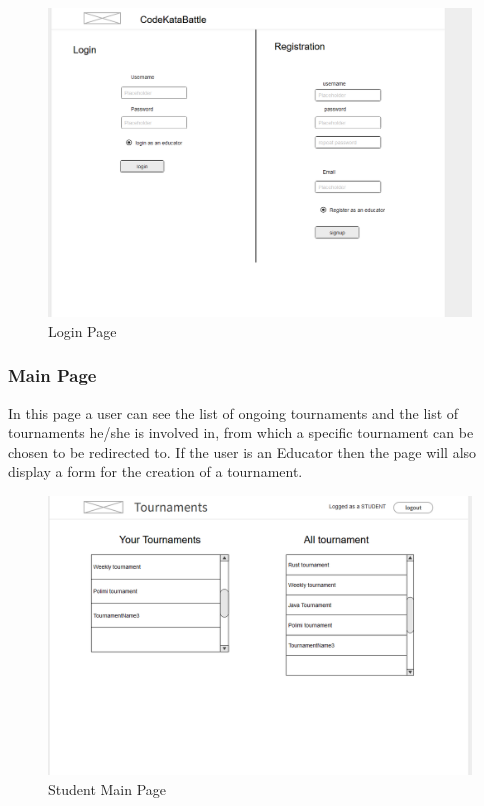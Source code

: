 \begin{figure}[H]
    \centering
    \includegraphics[width=1\linewidth]{misc//Images//UI Mockups/login.png}
    \caption{Login Page}
    \label{fig:enter-label}
\end{figure}
\newpage
\subsubsection{Main Page}
In this page a user can see the list of ongoing tournaments and the list of tournaments he/she is involved in, from which a specific tournament can be chosen to be redirected to.
If the user is an Educator then the page will also display a form for the creation of a tournament.

\begin{figure}[H]
    \centering
    \includegraphics[width=0.8\linewidth]{misc//Images//UI Mockups/studMain.png}
    \caption{Student Main Page}
    \label{fig:enter-label}
\end{figure}


